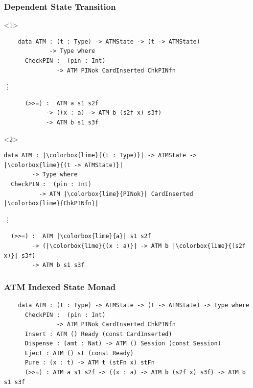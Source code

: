 \documentclass[compress]{beamer}
\begin{document}
\begin{frame}[fragile]
  \frametitle{Dependent State Transition}

  \begin{onlyenv}<1>
  \begin{verbatim}
    data ATM : (t : Type) -> ATMState -> (t -> ATMState)
             -> Type where
      CheckPIN :  (pin : Int)
               -> ATM PINok CardInserted ChkPINfn
  \end{verbatim}
  \vspace*{-5mm}
  \hspace*{1cm} \vdots
  \begin{verbatim}
      (>>=) :  ATM a s1 s2f
            -> ((x : a) -> ATM b (s2f x) s3f)
            -> ATM b s1 s3f
  \end{verbatim}
  \end{onlyenv}

  \begin{onlyenv}<2>
  \begin{verbatim}
data ATM : |\colorbox{lime}{(t : Type)}| -> ATMState -> |\colorbox{lime}{(t -> ATMState)}|
        -> Type where
  CheckPIN :  (pin : Int)
          -> ATM |\colorbox{lime}{PINok}| CardInserted |\colorbox{lime}{ChkPINfn}|
  \end{verbatim}
  \vspace*{-5mm}
  \hspace*{1cm} \vdots
  \begin{verbatim}
  (>>=) :  ATM |\colorbox{lime}{a}| s1 s2f
        -> (|\colorbox{lime}{(x : a)}| -> ATM b |\colorbox{lime}{(s2f x)}| s3f)
        -> ATM b s1 s3f
  \end{verbatim}
  \end{onlyenv}

\end{frame}


\begin{frame}[fragile]
  \frametitle{ATM Indexed State Monad}

  \begin{verbatim}
    data ATM : (t : Type) -> ATMState -> (t -> ATMState) -> Type where
      CheckPIN :  (pin : Int)
               -> ATM PINok CardInserted ChkPINfn
      Insert : ATM () Ready (const CardInserted)
      Dispense : (amt : Nat) -> ATM () Session (const Session)
      Eject : ATM () st (const Ready)
      Pure : (x : t) -> ATM t (stFn x) stFn
      (>>=) : ATM a s1 s2f -> ((x : a) -> ATM b (s2f x) s3f) -> ATM b s1 s3f
  \end{verbatim}
\end{frame}
\end{document}
